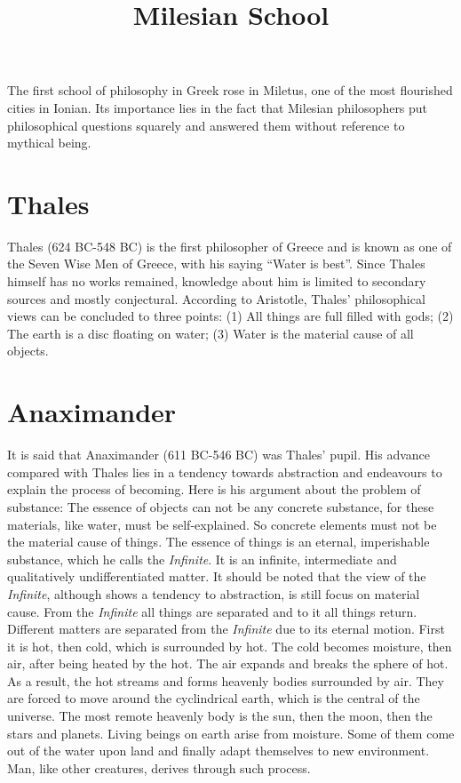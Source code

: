 \documentclass[11pt]{article}
\title{Milesian School}
\date{}
\begin{document}
\begin{sloppypar}
  \maketitle

  \linenumbers
  
The first school of philosophy in Greek rose in Miletus, one of the most flourished cities in Ionian. 
Its importance lies in the fact that Milesian philosophers put philosophical questions squarely and answered them without reference to mythical being.

\section{Thales}
Thales (624 BC-548 BC) is the first philosopher of Greece and is known as one of the Seven Wise Men of Greece, with his saying “Water is best”. 
Since Thales himself has no works remained, knowledge about him is limited to secondary sources and mostly conjectural. 
According to Aristotle, Thales’ philosophical views can be concluded to three points: 
(1) All things are full filled with gods; 
(2) The earth is a disc floating on water; 
(3) Water is the material cause of all objects.
  
\section{Anaximander}
It is said that Anaximander (611 BC-546 BC) was Thales’ pupil. 
His advance compared with Thales lies in a tendency towards abstraction and endeavours to explain the process of becoming. 
Here is his argument about the problem of substance: 
The essence of objects can not be any concrete substance, for these materials, like water, must be self-explained. 
So concrete elements must not be the material cause of things. 
The essence of things is an eternal, imperishable substance, which he calls the \textit{Infinite}. 
It is an infinite, intermediate and qualitatively undifferentiated matter. 
It should be noted that the view of the \textit{Infinite}, although shows a tendency to abstraction, is still focus on material cause. 
From the \textit{Infinite} all things are separated and to it all things return. 
Different matters are separated from the \textit{Infinite} due to its eternal motion. 
First it is hot, then cold, which is surrounded by hot. 
The cold becomes moisture, then air, after being heated by the hot. 
The air expands and breaks the sphere of hot. 
As a result, the hot streams and forms heavenly bodies surrounded by air. 
They are forced to move around the cyclindrical earth, which is the central of the universe. 
The most remote heavenly body is the sun, then the moon, then the stars and planets. 
Living beings on earth arise from moisture. 
Some of them come out of the water upon land and finally adapt themselves to new environment. 
Man, like other creatures, derives through such process.


\end{sloppypar}
\end{document}
